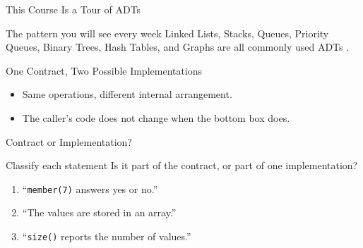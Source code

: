 \documentclass[aspectratio=169]{beamer}
\begin{document}
\begin{frame}{This Course Is a Tour of ADTs}
  \begin{block}{The pattern you will see every week}
    Linked Lists, Stacks, Queues, Priority Queues, Binary Trees, Hash Tables,
    and Graphs are all commonly used ADTs
    \cite{Karumanchi2017_data_structures_algorithms_made_easy}.
  \end{block}
\end{frame}

\begin{frame}{One Contract, Two Possible Implementations}
  \begin{center}
  \end{center}
  \begin{itemize}
    \item Same operations, different internal arrangement.
    \item The caller's code does not change when the bottom box does.
  \end{itemize}
\end{frame}

\begin{frame}{Contract or Implementation?}
  \begin{block}{Classify each statement}
    Is it part of the contract, or part of one implementation?
  \end{block}
  \begin{enumerate}
    \item ``\texttt{member(7)} answers yes or no.''
    \item ``The values are stored in an array.''
    \item ``\texttt{size()} reports the number of values.''
  \end{enumerate}
\end{frame}
\end{document}
